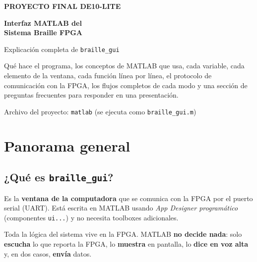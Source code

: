 \documentclass[11pt,a4paper]{article}
\newcommand{\cod}[1]{\texttt{#1}}
\begin{document}
\begin{titlepage}
\centering
\vspace*{3cm}
{\color{verde}\large\bfseries PROYECTO FINAL \textendash{} DE10-LITE\par}
\vspace{0.8cm}
{\color{tinta}\Huge\bfseries Interfaz MATLAB del\\[0.2cm] Sistema Braille FPGA\par}
\vspace{0.6cm}
{\Large\color{gris} Explicación completa de \texttt{braille\_gui}\par}
\vspace{1.5cm}
\begin{minipage}{0.8\textwidth}
\begin{idea}
Qué hace el programa, los conceptos de MATLAB que usa, cada variable, cada
elemento de la ventana, cada función línea por línea, el protocolo de
comunicación con la FPGA, los flujos completos de cada modo y una sección de
preguntas frecuentes para responder en una presentación.
\end{idea}
\end{minipage}
\vfill
{\color{gris} Archivo del proyecto: \texttt{matlab} (se ejecuta como \texttt{braille\_gui.m})\par}
\end{titlepage}

\tableofcontents
\newpage

\section{Panorama general}

\subsection{¿Qué es \texttt{braille\_gui}?}
Es la \textbf{ventana de la computadora} que se comunica con la FPGA por el
puerto serial (UART). Está escrita en MATLAB usando \emph{App Designer
programático} (componentes \cod{ui...}) y no necesita toolboxes adicionales.

\begin{idea}
Toda la lógica del sistema vive en la FPGA. MATLAB \textbf{no decide nada}:
solo \textbf{escucha} lo que reporta la FPGA, lo \textbf{muestra} en pantalla,
lo \textbf{dice en voz alta} y, en dos casos, \textbf{envía} datos.
\end{idea}
\end{document}
